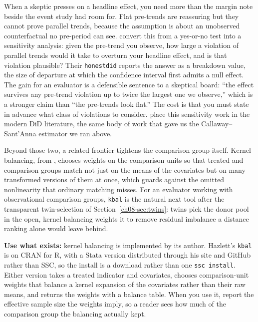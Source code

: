 When a skeptic presses on a headline effect, you need more than the margin note beside the event study had room for. Flat pre-trends are reassuring but they cannot prove parallel trends, because the assumption is about an unobserved counterfactual no pre-period can see. \textcite{rambachan2023honest} convert this from a yes-or-no test into a sensitivity analysis: given the pre-trend you observe, how large a violation of parallel trends would it take to overturn your headline effect, and is that violation plausible? Their \texttt{honestdid} reports the answer as a breakdown value, the size of departure at which the confidence interval first admits a null effect. The gain for an evaluator is a defensible sentence to a skeptical board: \enquote{the effect survives any pre-trend violation up to twice the largest one we observe,} which is a stronger claim than \enquote{the pre-trends look flat.} The cost is that you must state in advance what class of violations to consider. \textcite{roth2023trending} place this sensitivity work in the modern DiD literature, the same body of work that gave us the Callaway--Sant'Anna estimator we ran above.

Beyond those two, a related frontier tightens the comparison group itself. Kernel balancing, from \textcite{hazlett2020kernel}, chooses weights on the comparison units so that treated and comparison groups match not just on the means of the covariates but on many transformed versions of them at once, which guards against the omitted nonlinearity that ordinary matching misses. For an evaluator working with observational comparison groups, \texttt{kbal} is the natural next tool after the transparent twin-selection of Section~\ref{ch08-sec:twins}: twins pick the donor pool in the open, kernel balancing weights it to remove residual imbalance a distance ranking alone would leave behind.

\begin{kaobox}[frametitle=Existing tool: kernel balancing with \texttt{kbal}]
\textbf{Use what exists:} kernel balancing is implemented by its author. Hazlett's \texttt{kbal} is on CRAN for R, with a Stata version distributed through his site and GitHub rather than SSC, so the install is a download rather than one \texttt{ssc install}. Either version takes a treated indicator and covariates, chooses comparison-unit weights that balance a kernel expansion of the covariates rather than their raw means, and returns the weights with a balance table. When you use it, report the effective sample size the weights imply, so a reader sees how much of the comparison group the balancing actually kept.
\end{kaobox}

